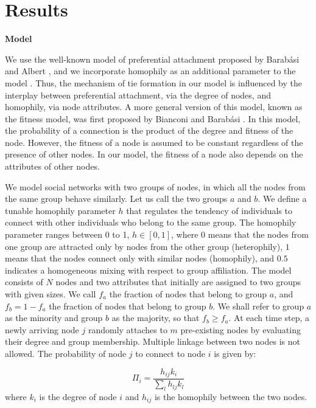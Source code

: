 \section{Results}


\textbf{Model} 

\noindent We use the well-known model of preferential attachment proposed by Barab\'{a}si and Albert \cite{Barabasi99}, and we incorporate  homophily as an additional parameter to the model \cite{de2013scale,avin2015homophily}. Thus, the mechanism of tie formation in our model is influenced by the interplay between preferential attachment, via the degree of nodes, and homophily, via node attributes. A more general version of this model, known as the fitness model, was first proposed by Bianconi and Barab\'{a}si  \cite{bianconi2001competition}. In this model, the probability of a connection is the product of the degree and fitness of the node. However, the fitness of a node is assumed to be constant regardless of the presence of other nodes. In our model, the fitness of a node also depends on the attributes of other nodes.



We model social networks with two groups of nodes, in which all the nodes from the same group behave similarly. Let us call the two groups $a$ and $b$. We define a tunable homophily parameter $h$ that regulates the tendency of individuals to connect with other individuals who belong to the same group. The homophily parameter ranges between 0 to 1, $h \in [0,1]$, where $0$ means that the nodes from one group are attracted only by nodes from the other group (heterophily), $1$ means that the nodes connect only with similar nodes (homophily), and $0.5$ indicates a homogeneous mixing with respect to group affiliation. The model consists of $N$ nodes and two attributes that initially are assigned to two groups with given sizes. We call $f_a$ the fraction of nodes that belong to group $a$, and $f_b = 1 - f_a$ the fraction of nodes that belong to group $b$. We shall refer to group $a$ as the minority and group $b$ as the majority, so that $f_b \ge f_a$. At each time step, a newly arriving node $j$ randomly attaches to $m$ pre-existing nodes by evaluating their degree and group membership. Multiple linkage between two nodes is not allowed. The probability of node $j$ to connect to node $i$ is given by:

\begin{equation}
\Pi_{i} = \frac{h_{ij} k_{i}}{\sum_{l} h_{lj} k_{l}}
\label{eq:homophilic_BA}
\end{equation}
where $k_{i}$ is the degree of node $i$ and $h_{ij}$ is the homophily between the two nodes.


